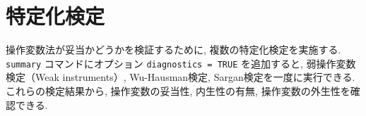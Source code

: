 \documentclass[
  letterpaper,
  xelatex,
  ja=standard, xelatex]{bxjsbook}
\newenvironment{Shaded}{\begin{snugshade}}{\end{snugshade}}
\newcommand{\AttributeTok}[1]{\textcolor[rgb]{0.40,0.45,0.13}{#1}}
\newcommand{\DecValTok}[1]{\textcolor[rgb]{0.68,0.00,0.00}{#1}}
\newcommand{\DocumentationTok}[1]{\textcolor[rgb]{0.37,0.37,0.37}{\textit{#1}}}
\newcommand{\FunctionTok}[1]{\textcolor[rgb]{0.28,0.35,0.67}{#1}}
\newcommand{\NormalTok}[1]{\textcolor[rgb]{0.00,0.23,0.31}{#1}}
\newcommand{\OtherTok}[1]{\textcolor[rgb]{0.00,0.23,0.31}{#1}}
\newcommand{\SpecialCharTok}[1]{\textcolor[rgb]{0.37,0.37,0.37}{#1}}
\begin{document}
\begin{Shaded}
\end{Shaded}

\section{特定化検定}\label{ux7279ux5b9aux5316ux691cux5b9a}

操作変数法が妥当かどうかを検証するために, 複数の特定化検定を実施する.
\texttt{summary} コマンドにオプション \texttt{diagnostics\ =\ TRUE}
を追加すると, 弱操作変数検定（Weak instruments）, Wu-Hausman検定,
Sargan検定を一度に実行できる. これらの検定結果から, 操作変数の妥当性,
内生性の有無, 操作変数の外生性を確認できる.
\end{document}

